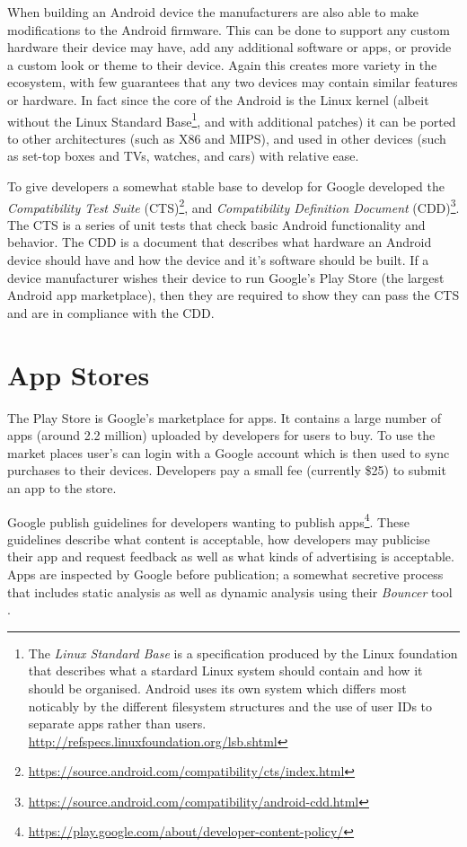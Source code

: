 \documentclass[thesis.tex]{subfiles}
\begin{document}
When building an Android device the manufacturers are also able to make
modifications to the Android firmware. This can be done to support any
custom hardware their device may have, add any additional software or
apps, or provide a custom look or theme to their device. Again this
creates more variety in the ecosystem, with few guarantees that any two
devices may contain similar features or hardware. In fact since the core
of the Android is the Linux kernel (albeit without the Linux Standard
Base\footnote{The \emph{Linux Standard Base} is a specification produced
  by the Linux foundation that describes what a stardard Linux system
  should contain and how it should be organised. Android uses its own
  system which differs most noticably by the different filesystem
  structures and the use of user IDs to separate apps rather than users.
  \url{http://refspecs.linuxfoundation.org/lsb.shtml}}, and with
additional patches) it can be ported to other architectures (such as X86
and MIPS), and used in other devices (such as set-top boxes and TVs,
watches, and cars) with relative ease.

To give developers a somewhat stable base to develop for Google
developed the \emph{Compatibility Test Suite} (CTS)\footnote{\url{https://source.android.com/compatibility/cts/index.html}},
and \emph{Compatibility Definition Document} (CDD)\footnote{\url{https://source.android.com/compatibility/android-cdd.html}}.
The CTS is a series of unit tests that check basic Android functionality
and behavior. The CDD is a document that describes what hardware an
Android device should have and how the device and it's software should
be built. If a device manufacturer wishes their device to run Google's
Play Store (the largest Android app marketplace), then they are required
to show they can pass the CTS and are in compliance with the CDD.

\section{App Stores}\label{app-stores}

The Play Store is Google's marketplace for apps. It contains a large
number of apps (around 2.2 million) uploaded by developers for users to
buy. To use the market places user's can login with a Google account
which is then used to sync purchases to their devices. Developers pay a
small fee (currently \$25) to submit an app to the store.

Google publish guidelines for developers wanting to publish
apps\footnote{\url{https://play.google.com/about/developer-content-policy/}}.
These guidelines describe what content is acceptable, how developers may
publicise their app and request feedback as well as what kinds of
advertising is acceptable. Apps are inspected by Google before
publication; a somewhat secretive process that includes static analysis
as well as dynamic analysis using their \emph{Bouncer} tool
\cite{oberheide_dissecting_2012}.
\end{document}
